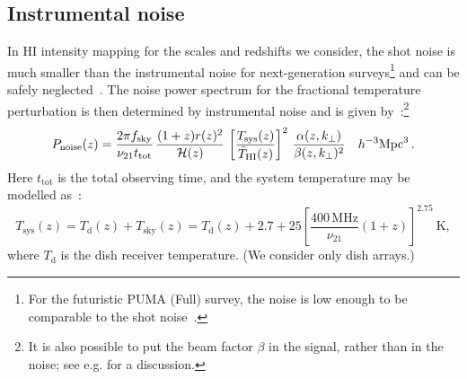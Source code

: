 \subsection{Instrumental noise}\label{ssec:inoise}
%
In HI intensity mapping for the scales and redshifts we consider, the shot noise is much smaller than the instrumental noise for next-generation surveys\footnote{{For the futuristic PUMA (Full) survey, the noise is low enough to be comparable to the shot noise~\cite{Chen:2018qiu}.}} and can be safely neglected~\cite{Castorina:2016bfm,Villaescusa-Navarro:2018vsg}. 
The noise power spectrum for the fractional temperature perturbation is then determined by instrumental noise and is given by~\cite{Bull:2014rha,Alonso:2017dgh}:\footnote{It is also possible to put the beam factor $\beta$ in the signal, rather than in the noise; see e.g. \cite{Bernal:2019jdo} for a discussion.}
\begin{equation}
{P}_{\mathrm{noise}}(z) = \frac{2\pi f_{\mathrm{sky}}}{\nu_{21} t_{\mathrm{tot}}} \, \frac{(1+z) r(z)^{2} }{\mathcal{H}(z) }\,\left[\frac{T_{\mathrm{sys}}(z)}{\bar{T}_{{\mathrm{HI}}}(z)}\right]^2\, \frac{\alpha(z,k_\perp)}{\beta(z,k_\perp)^2}
~~~ h^{-3}\mathrm{Mpc}^{3} \,. 
\label{e2.24}
\end{equation}
Here $t_\mathrm{tot}$ is the total observing time, and  the system temperature may be modelled as~\citep{Ansari:2018ury}:
\begin{equation}
T_{\mathrm{sys}}(z) = T_\mathrm{d}(z)+T_\mathrm{sky}(z) =T_\mathrm{d}(z) + 2.7 + 25\left[\frac{400\,\mathrm{MHz}}{\nu_{21}} (1+z)\right]^{2.75} ~ \mathrm{K}, \label{e2.25}
\end{equation} 
where $T_\mathrm{d}$ is the dish receiver temperature. (We consider only dish arrays.)

